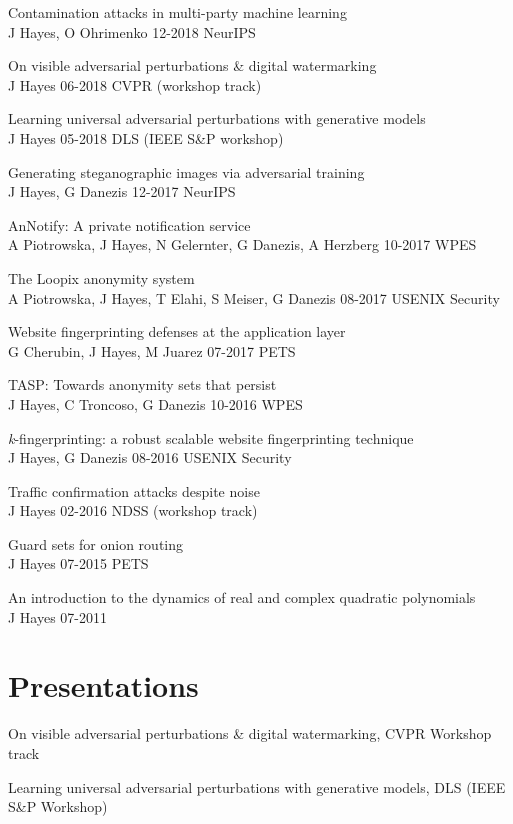\documentclass[margin,line]{res}
\begin{document}
\begin{resume}
Contamination attacks in multi-party machine learning\\
J Hayes, O Ohrimenko 12-2018 NeurIPS 

On visible adversarial perturbations \& digital watermarking\\
J Hayes 06-2018 CVPR (workshop track) 

Learning universal adversarial perturbations with generative models\\
J Hayes 05-2018 DLS (IEEE S\&P workshop)  

Generating steganographic images via adversarial training\\
J Hayes, G Danezis 12-2017 NeurIPS  

AnNotify: A private notification service\\
A Piotrowska, J Hayes, N Gelernter, G Danezis, A Herzberg 10-2017 WPES  

The Loopix anonymity system\\
A Piotrowska, J Hayes, T Elahi, S Meiser, G Danezis 08-2017 USENIX Security  

Website fingerprinting defenses at the application layer\\
G Cherubin, J Hayes, M Juarez 07-2017 PETS  

TASP: Towards anonymity sets that persist\\
J Hayes, C Troncoso, G Danezis 10-2016 WPES  

\emph{k}-fingerprinting: a robust scalable website fingerprinting technique\\
J Hayes, G Danezis 08-2016 USENIX Security  

Traffic confirmation attacks despite noise\\
J Hayes 02-2016 NDSS (workshop track)  

Guard sets for onion routing\\
J Hayes 07-2015 PETS  

An introduction to the dynamics of real and complex quadratic polynomials\\
J Hayes 07-2011  

\section{\sc Presentations}

On visible adversarial perturbations \& digital watermarking,
CVPR Workshop track

Learning universal adversarial perturbations with generative models,
DLS (IEEE S\&P Workshop)


\end{resume}
\end{document}
